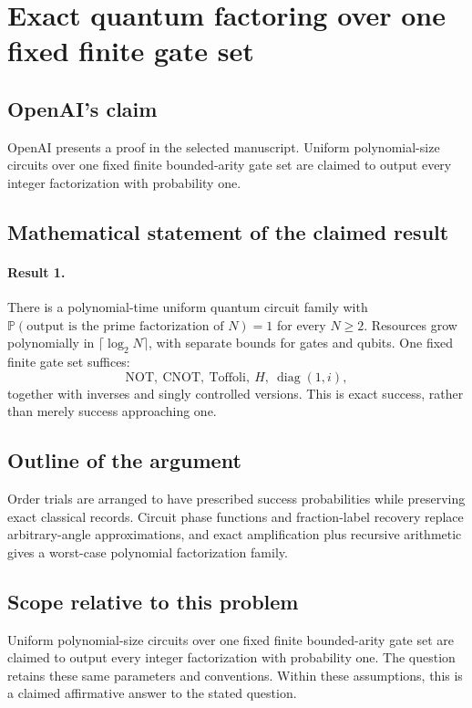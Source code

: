\documentclass[11pt]{article}
\begin{document}
\section*{Exact quantum factoring over one fixed finite gate set}

\subsection{OpenAI's claim}
OpenAI presents a proof in the selected manuscript. Uniform polynomial-size circuits over one fixed finite bounded-arity gate set are claimed to output every integer factorization with probability one.

\subsection{Mathematical statement of the claimed result}
\paragraph{Result 1.} There is a polynomial-time uniform quantum circuit family with \(\mathbb P(\text{output is the prime factorization of }N)=1\) for every \(N\ge2\). Resources grow polynomially in \(\lceil\log_2N\rceil\), with separate bounds for gates and qubits. One fixed finite gate set suffices:
\[
 \mathrm{NOT},\ \mathrm{CNOT},\ \mathrm{Toffoli},\ H,\ \operatorname{diag}(1,i),
\]
together with inverses and singly controlled versions. This is exact success, rather than merely success approaching one.

\subsection{Outline of the argument}
Order trials are arranged to have prescribed success probabilities while preserving exact classical records. Circuit phase functions and fraction-label recovery replace arbitrary-angle approximations, and exact amplification plus recursive arithmetic gives a worst-case polynomial factorization family.

\subsection{Scope relative to this problem}
Uniform polynomial-size circuits over one fixed finite bounded-arity gate set are claimed to output every integer factorization with probability one. The question retains these same parameters and conventions. Within these assumptions, this is a claimed affirmative answer to the stated question.
\end{document}
